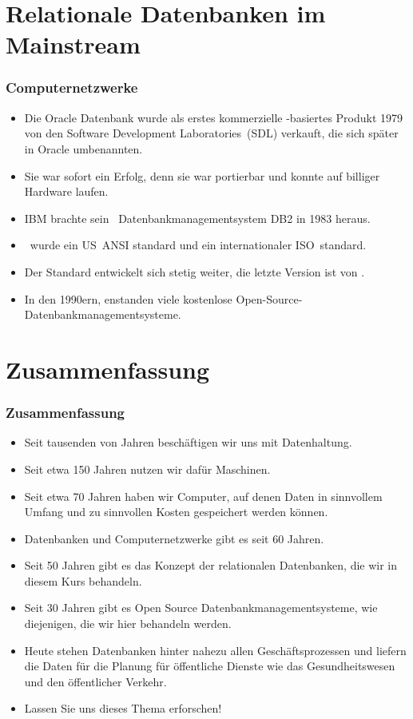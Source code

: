 \documentclass[aspectratio=169,mathserif,notheorems]{beamer}%
\begin{document}
\section{Relationale Datenbanken im Mainstream}
%
%
\begin{frame}%
\frametitle{Computernetzwerke}%
\begin{itemize}%
\item Die Oracle Datenbank wurde als erstes kommerzielle \sql-basiertes Produkt 1979 von den Software Development Laboratories~(SDL) verkauft, die sich später in Oracle umbenannten\cite{C20245YOQ}.%
\item<2-> Sie war sofort ein Erfolg, denn sie war portierbar und konnte auf billiger Hardware laufen.%
\item<3-> IBM brachte sein \sql\ Datenbankmanagementsystem DB2 in 1983 heraus\cite{C20245YOQ,HS2013THAGOID}.%
\item<4-> \sql\ wurde \citeyear{ANSIX3135} ein US~ANSI standard und \citeyear{ISO90751987} ein internationaler ISO~standard\cite{ANSIX3135,ISO90751987}.%
\item<5-> Der Standard entwickelt sich stetig weiter, die letzte Version ist von \citeyear{ISOIEC9707112023E}\cite{ISOIEC9707112023E}.%
\item<6-> In den 1990ern, enstanden viele kostenlose Open-Source-Datenbankmanagementsysteme\cite{C20245YOQ}.%
\end{itemize}%
\end{frame}%
%
\section{Zusammenfassung}%
%
\begin{frame}%
\frametitle{Zusammenfassung}%
\begin{itemize}%
\item Seit tausenden von Jahren beschäftigen wir uns mit Datenhaltung.%
\item<2-> Seit etwa 150 Jahren nutzen wir dafür Maschinen.%
\item<3-> Seit etwa 70 Jahren haben wir Computer, auf denen Daten in sinnvollem Umfang und zu sinnvollen Kosten gespeichert werden können.%
\item<4-> Datenbanken und Computernetzwerke gibt es seit 60 Jahren.%
\item<5-> Seit 50 Jahren gibt es das Konzept der relationalen Datenbanken, die wir in diesem Kurs behandeln.%
\item<6-> Seit 30 Jahren gibt es Open Source Datenbankmanagementsysteme, wie diejenigen, die wir hier behandeln werden.%
\item<7-> Heute stehen Datenbanken hinter nahezu allen Geschäftsprozessen und liefern die Daten für die Planung für öffentliche Dienste wie das Gesundheitswesen und den öffentlicher Verkehr.%
\item<8-> Lassen Sie uns dieses Thema erforschen!%
\end{itemize}%
\end{frame}%
%
\endPresentation%
\end{document}
